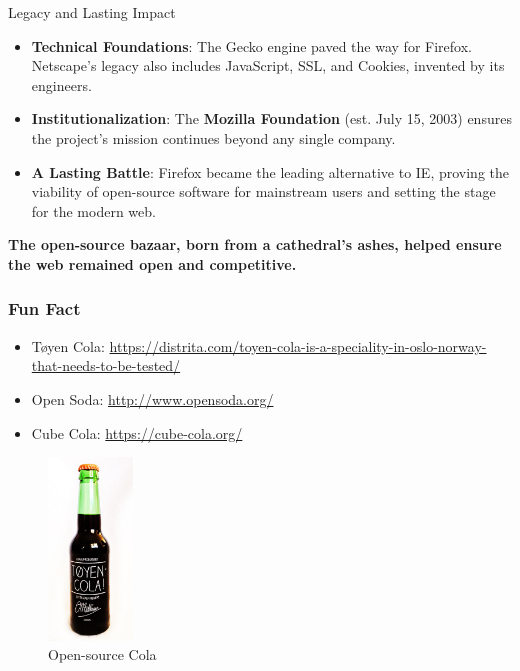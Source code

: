 \documentclass{beamer}
\begin{document}
\begin{frame}[t]{Legacy and Lasting Impact}
\begin{itemize}
    \item \textbf{Technical Foundations}: The Gecko engine paved the way for Firefox. Netscape's legacy also includes JavaScript, SSL, and Cookies, invented by its engineers.
    \item \textbf{Institutionalization}: The \textbf{Mozilla Foundation} (est. July 15, 2003) ensures the project's mission continues beyond any single company.
    \item \textbf{A Lasting Battle}: Firefox became the leading alternative to IE, proving the viability of open-source software for mainstream users and setting the stage for the modern web.
\end{itemize}

\begin{center}
    \textbf{The open-source bazaar, born from a cathedral's ashes, helped ensure the web remained open and competitive.}
\end{center}
\end{frame}

\begin{frame}[t]
    \frametitle{Fun Fact}
    \begin{itemize}
        \scriptsize
        \item Tøyen Cola: {\scriptsize\url{https://distrita.com/toyen-cola-is-a-speciality-in-oslo-norway-that-needs-to-be-tested/}}
        \item Open Soda: {\scriptsize\url{http://www.opensoda.org/}}
        \item Cube Cola: {\scriptsize\url{https://cube-cola.org/}}
    \end{itemize}

    \begin{figure}
        \includegraphics[width=0.2\textwidth]{images/cola.jpg}
    \caption{Open-source Cola}
    \end{figure}
    
    
\end{frame}
\end{document}
